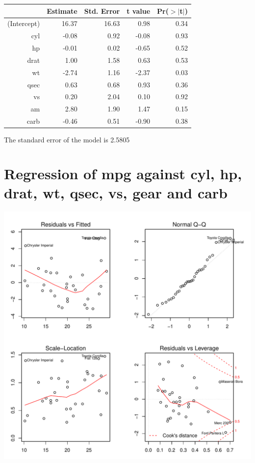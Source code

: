 \documentclass{article}\usepackage[]{graphicx}\usepackage[]{color}
\makeatletter
\def\maxwidth{ %
  \ifdim\Gin@nat@width>\linewidth
    \linewidth
  \else
    \Gin@nat@width
  \fi
}
\newenvironment{knitrout}{}{} %
\makeatother
\begin{document}
\begin{table}[ht]
\centering
\begin{tabular}{rrrrr}
  \hline
 & Estimate & Std. Error & t value & Pr($>$$|$t$|$) \\ 
  \hline
(Intercept) & 16.37 & 16.63 & 0.98 & 0.34 \\ 
  cyl & -0.08 & 0.92 & -0.08 & 0.93 \\ 
  hp & -0.01 & 0.02 & -0.65 & 0.52 \\ 
  drat & 1.00 & 1.58 & 0.63 & 0.53 \\ 
  wt & -2.74 & 1.16 & -2.37 & 0.03 \\ 
  qsec & 0.63 & 0.68 & 0.93 & 0.36 \\ 
  vs & 0.20 & 2.04 & 0.10 & 0.92 \\ 
  am & 2.80 & 1.90 & 1.47 & 0.15 \\ 
  carb & -0.46 & 0.51 & -0.90 & 0.38 \\ 
   \hline
\end{tabular}
\end{table}




The standard error of the model is 2.5805

\newpage

\section{Regression of mpg against cyl, hp, drat, wt, qsec, vs, gear and carb }
\begin{knitrout}
\color{fgcolor}

{\centering \includegraphics[width=\maxwidth]{figure/lm-cyl-hp-drat-wt-qsec-vs-gear-carb} 

}



\end{knitrout}
\end{document}
